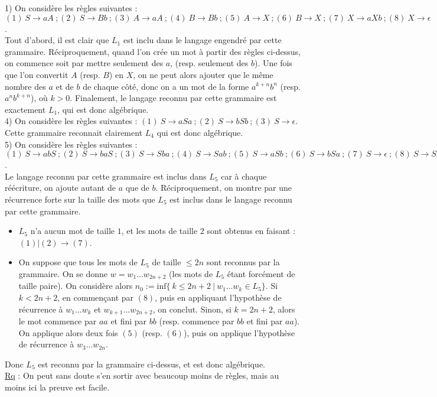 \documentclass[11pt,a4paper]{article}
\begin{document}
1) On considère les règles suivantes : $(1) \ S \to aA  \ ; (2)  \ S \to Bb \ ; (3) \ A \to aA \ ; (4) \ B \to Bb \ ; (5) \ A \to X \ ; (6) \ B \to X \ ; (7) \ X \to aXb \ ; (8) \ X \to \epsilon$. \\ 
Tout d'abord, il est clair que $L_1$ est inclu dans le langage engendré par cette grammaire. Réciproquement, quand l'on crée un mot à partir des règles ci-dessus, on commence soit par mettre seulement des $a$, (resp. seulement des $b$). Une fois que l'on convertit $A$ (resp. $B$) en $X$, on ne peut alors ajouter que le même nombre des $a$ et de $b$ de chaque côté, donc on a un mot de la forme $a^{k+n}b^n$ (resp. $a^nb^{k+n}$), où $k>0$. Finalement, le langage reconnu par cette grammaire est exactement $L_1$, qui est donc algébrique.
\\

4) On considère les règles suivantes : $ (1) \ S \to aSa \ ; (2) \ S \to bSb \ ; (3) \ S \to \epsilon$. \\ 
Cette grammaire reconnait clairement $L_4$ qui est donc algébrique.
\\

5) On considère les règles suivantes : $(1) \ S \to abS \ ; (2) \ S \to baS \ ; (3) \ S \to Sba \ ; (4) \ S \to Sab \ ; (5) \ S \to aSb \ ; (6) \ S \to bSa \ ; (7) \ S \to \epsilon \ ; (8) \ S \to SS $. \\
Le langage reconnu par cette grammaire est inclus dans $L_5$ car à chaque réécriture, on ajoute autant de $a$ que de $b$. Réciproquement, on montre par une récurrence forte sur la taille des mots que $L_5$ est inclus dans le langage reconnu par cette grammaire.
\begin{itemize}
\item $L_5$ n'a aucun mot de taille $1$, et les mots de taille $2$ sont obtenus en faisant : $(1) | (2) \to (7)$.
\item On suppose que tous les mots de $L_5$ de taille $ \leq 2n$ sont reconnus par la grammaire. On se donne $w=w_1\dots w_{2n+2}$ (les mots de $L_5$ étant forcément de taille paire). On considère alors $n_0 := \text{inf}\{\  k \leq 2n+2 \ | \ w_1\dots w_k \in L_5 \}$. Si $k<2n+2$, en commençant par $(8)$, puis en appliquant l'hypothèse de récurrence à $w_1\dots w_k$ et $w_{k+1}\dots w_{2n+2}$, on conclut. Sinon, si $k=2n+2$, alors le mot commence par $aa$ et fini par $bb$ (resp. commence par $bb$ et fini par $aa$). On applique alors deux fois $(5)$ (resp. $(6)$), puis on applique l'hypothèse de récurrence à $w_3\dots w_{2n}$.
\end{itemize}
Donc $L_5$ est reconnu par la grammaire ci-dessus, et est donc algébrique.
\\

\underline{Rq} : On peut sans doute s'en sortir avec beaucoup moins de règles, mais au moins ici la preuve est facile.
\end{document}
